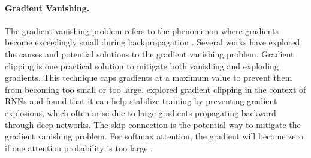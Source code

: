 

\paragraph{Gradient Vanishing.} The gradient vanishing problem refers to the phenomenon where gradients become exceedingly small during backpropagation \cite{lillicrap2020backpropagation}.
Several works have explored the causes and potential solutions to the gradient vanishing problem. Gradient clipping \cite{zhang2019gradient} is one practical solution to mitigate both vanishing and exploding gradients. This technique caps gradients at a maximum value to prevent them from becoming too small or too large. \citet{pascanu2013difficulty} explored gradient clipping in the context of RNNs and found that it can help stabilize training by preventing gradient explosions, which often arise due to large gradients propagating backward through deep networks. The skip connection \cite{he2016deep} is the potential way to mitigate the gradient vanishing problem. For softmax attention, the gradient will become zero if one attention probability is too large \cite{vaswani2017attention}.

